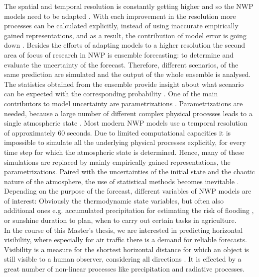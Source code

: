 The spatial and temporal resolution is constantly getting higher and so the NWP models need to be adapted \cite{aladin1, theis_hense_damrath_2005}. With each improvement in the resolution more processes can be calculated explicitly, instead of using inaccurate empirically gained representations, and as a result, the contribution of model error is going down \cite{bauer2015quiet}. Besides the efforts of adapting models to a higher resolution the second area of focus of research in NWP is ensemble forecasting: to determine and evaluate the uncertainty of the forecast. Therefore, different scenarios, of the same prediction are simulated and the output of the whole ensemble is analysed. The statistics obtained from the ensemble provide insight about what scenario can be expected with the corresponding probability \cite{batkai2016mathematical}.
One of the main contributors to model uncertainty are parametrizations \cite{ollinaho2017towards, leutbecher2008ensemble}. 
Parametrizations are needed, because a large number of different complex physical processes leads to a single atmospheric state \cite{coiffier2011fundamentals}. Most modern NWP models use a temporal resolution of approximately 60 seconds. Due to limited computational capacities it is impossible to simulate all the underlying physical processes explicitly, for every time step for which the atmospheric state is determined. Hence, many of these simulations are replaced by mainly empirically gained representations, the parametrizations.
Paired with the uncertainties of the initial state and the chaotic nature of the atmosphere, the use of statistical methods becomes inevitable \cite{palmer2009stochastic, buizza1999stochastic, leutbecher2008ensemble}.\\
Depending on the purpose of the forecast, different variables of NWP models are of interest: Obviously the thermodynamic state variables, but often also additional ones e.g. accumulated precipitation for estimating the risk of flooding \cite{theis_hense_damrath_2005}, or sunshine duration to plan, when to carry out certain tasks in agriculture.\\
In the course of this Master's thesis, we are interested in predicting horizontal visibility, where especially for air traffic there is a demand for reliable forecasts.
Visibility is a measure for the shortest horizontal distance for which an object is still visible to a human observer, considering all directions \parencite{clark2008prediction, WMO, price2007advanced}.
It is effected by a great number of non-linear processes like precipitation and radiative processes.

